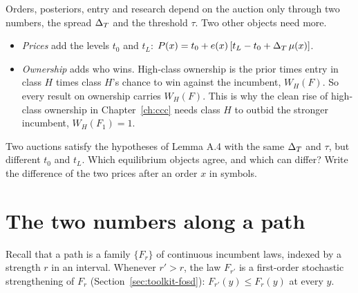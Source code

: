 Orders, posteriors, entry and research depend on the auction only through two numbers, the spread \(\Delta_T\) and the
threshold \(\tau\). Two other objects need more.
\begin{itemize}
\item \emph{Prices} add the levels \(t_0\) and \(t_L\): \(P(x)=t_0+e(x)\,[t_L-t_0+\Delta_T\,\mu(x)]\).
\item \emph{Ownership} adds who wins. High-class ownership is the prior times entry in class \(H\) times class
\(H\)'s chance to win against the incumbent, \(W_H(F)\). So every result on ownership carries \(W_H(F)\). This is why
the clean rise of high-class ownership in Chapter~\ref{ch:ccc} needs class \(H\) to outbid the stronger incumbent,
\(W_H(F_1)=1\).
\end{itemize}

\begin{checkyourself}\label{q:trading-levels-two}
Two auctions satisfy the hypotheses of Lemma A.4 with the same \(\Delta_T\) and \(\tau\), but different \(t_0\) and
\(t_L\). Which equilibrium objects agree, and which can differ? Write the difference of the two prices after an
order \(x\) in symbols.
\end{checkyourself}

\section{The two numbers along a path}\label{sec:trading-path}

Recall that a path is a family \(\{F_r\}\) of continuous incumbent laws, indexed by a strength \(r\) in an interval.
Whenever \(r'>r\), the law \(F_{r'}\) is a first-order stochastic strengthening of \(F_r\)
(Section~\ref{sec:toolkit-fosd}): \(F_{r'}(y)\le F_r(y)\) at every \(y\).

